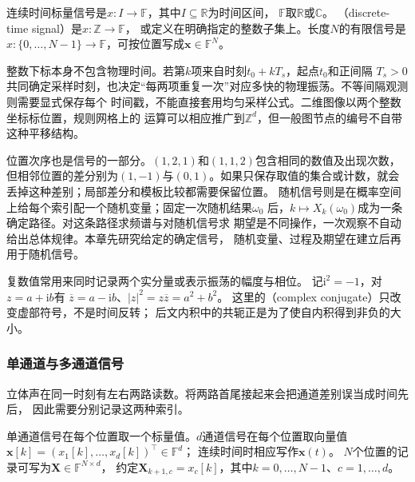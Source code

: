\begin{definition}[信号的索引类型]
  \label{def:signal-index-types}
  连续时间标量信号是$x:I\to\mathbb F$，其中$I\subseteq\mathbb R$为时间区间，
  $\mathbb F$取$\mathbb R$或$\mathbb C$。
  （discrete-time signal）是$x:\mathbb Z\to\mathbb F$，
  或定义在明确指定的整数子集上。长度$N$的有限信号是
  $x:\{0,\ldots,N-1\}\to\mathbb F$，可按位置写成$\bm x\in\mathbb F^N$。
\end{definition}

整数下标本身不包含物理时间。若第$k$项来自时刻$t_0+kT_s$，起点$t_0$和正间隔
$T_s>0$共同确定采样时刻，也决定“每两项重复一次”对应多快的物理振荡。不等间隔观测则需要显式保存每个
时间戳，不能直接套用均匀采样公式。二维图像以两个整数坐标标位置，规则网格上的
运算可以相应推广到$\mathbb Z^d$，但一般图节点的编号不自带这种平移结构。

位置次序也是信号的一部分。$(1,2,1)$和$(1,1,2)$包含相同的数值及出现次数，
但相邻位置的差分别为$(1,-1)$与$(0,1)$。如果只保存取值的集合或计数，就会
丢掉这种差别；局部差分和模板比较都需要保留位置。
随机信号则是在概率空间上给每个索引配一个随机变量；固定一次随机结果$\omega_0$
后，$k\mapsto X_k(\omega_0)$成为一条确定路径。对这条路径求频谱与对随机信号求
期望是不同操作，一次观察不自动给出总体规律。本章先研究给定的确定信号，
随机变量、过程及期望在建立后再用于随机信号。

复数值常用来同时记录两个实分量或表示振荡的幅度与相位。
记$\mathrm i^2=-1$，对$z=a+\mathrm ib$有
$\overline z=a-\mathrm ib$、$|z|^2=z\overline z=a^2+b^2$。
这里的（complex conjugate）只改变虚部符号，不是时间反转；
后文内积中的共轭正是为了使自内积得到非负的大小。

\subsubsection{单通道与多通道信号}

立体声在同一时刻有左右两路读数。将两路首尾接起来会把通道差别误当成时间先后，
因此需要分别记录这两种索引。
\begin{definition}[标量信号与向量值信号]
  \label{def:signal-multichannel}
  单通道信号在每个位置取一个标量值。$d$通道信号在每个位置取向量值
  $\bm x[k]=(x_1[k],\ldots,x_d[k])^\top\in\mathbb F^d$；
  连续时间时相应写作$\bm x(t)$。
  $N$个位置的记录可写为$\bm X\in\mathbb F^{N\times d}$，
  约定$\bm X_{k+1,c}=x_c[k]$，其中$k=0,\ldots,N-1$、$c=1,\ldots,d$。
\end{definition}

